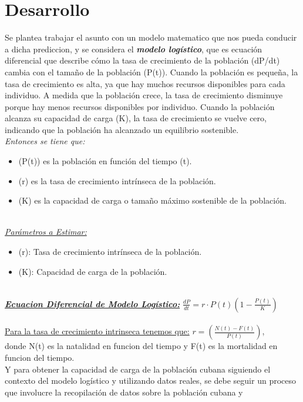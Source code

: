 \documentclass[a4paper,10pt,twocolumn]{article}
\begin{document}
\section{Desarrollo}\label{sec:dev}
 Se plantea trabajar el asunto con un modelo matematico que nos pueda conducir a dicha prediccion, y se considera 
 el \textit{\textbf{modelo logístico}}, que es ecuación diferencial que describe cómo la tasa de crecimiento de la población (dP/dt) 
 cambia con el tamaño de la población (P(t)). Cuando la población es pequeña, la tasa de crecimiento es alta, ya que 
 hay muchos recursos disponibles para cada individuo. A medida que la población crece, la tasa de crecimiento disminuye 
 porque hay menos recursos disponibles por individuo. Cuando la población alcanza su capacidad de carga (K), la tasa 
 de crecimiento se vuelve cero, indicando que la población ha alcanzado un equilibrio sostenible.\\
 \textit{Entonces se tiene que:}
\begin{itemize}
    \item (P(t)) es la población en función del tiempo (t).
    \item (r) es la tasa de crecimiento intrínseca de la población.
    \item (K) es la capacidad de carga o tamaño máximo sostenible de la población.
\end{itemize}\\
\textit{\underline{Parámetros a Estimar:}}
\begin{itemize}
    \item (r): Tasa de crecimiento intrínseca de la población. 
    \item (K): Capacidad de carga de la población.
\end{itemize}\\
\textit{\textbf{\underline{Ecuacion Diferencial de Modelo Logístico:}}} $\frac{dP}{dt} = r \cdot P(t)(1 - \frac{P(t)}{K}) $\\\\
\underline{Para la tasa de crecimiento intrinseca tenemos que:} $r = (\frac{N(t)-F(t)}{P(t)})$,\\ 
donde N(t) es la natalidad en funcion del tiempo y F(t) es la mortalidad en funcion del tiempo.\\
Y para obtener la capacidad de carga de la población cubana siguiendo el contexto del modelo logístico y utilizando 
datos reales, se debe seguir un proceso que involucre la recopilación de datos sobre la población cubana y 
\end{document}

